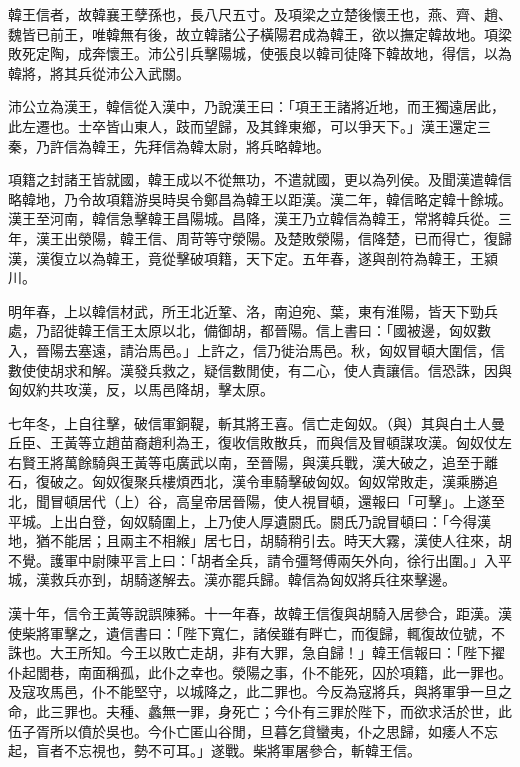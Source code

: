 
\begin{pinyinscope}
韓王信者，故韓襄王孽孫也，長八尺五寸。及項梁之立楚後懷王也，燕、齊、趙、魏皆已前王，唯韓無有後，故立韓諸公子橫陽君成為韓王，欲以撫定韓故地。項梁敗死定陶，成奔懷王。沛公引兵擊陽城，使張良以韓司徒降下韓故地，得信，以為韓將，將其兵從沛公入武關。

沛公立為漢王，韓信從入漢中，乃說漢王曰：「項王王諸將近地，而王獨遠居此，此左遷也。士卒皆山東人，跂而望歸，及其鋒東鄉，可以爭天下。」漢王還定三秦，乃許信為韓王，先拜信為韓太尉，將兵略韓地。

項籍之封諸王皆就國，韓王成以不從無功，不遣就國，更以為列侯。及聞漢遣韓信略韓地，乃令故項籍游吳時吳令鄭昌為韓王以距漢。漢二年，韓信略定韓十餘城。漢王至河南，韓信急擊韓王昌陽城。昌降，漢王乃立韓信為韓王，常將韓兵從。三年，漢王出滎陽，韓王信、周苛等守滎陽。及楚敗滎陽，信降楚，已而得亡，復歸漢，漢復立以為韓王，竟從擊破項籍，天下定。五年春，遂與剖符為韓王，王潁川。

明年春，上以韓信材武，所王北近鞏、洛，南迫宛、葉，東有淮陽，皆天下勁兵處，乃詔徙韓王信王太原以北，備御胡，都晉陽。信上書曰：「國被邊，匈奴數入，晉陽去塞遠，請治馬邑。」上許之，信乃徙治馬邑。秋，匈奴冒頓大圍信，信數使使胡求和解。漢發兵救之，疑信數閒使，有二心，使人責讓信。信恐誅，因與匈奴約共攻漢，反，以馬邑降胡，擊太原。

七年冬，上自往擊，破信軍銅鞮，斬其將王喜。信亡走匈奴。（與）其與白土人曼丘臣、王黃等立趙苗裔趙利為王，復收信敗散兵，而與信及冒頓謀攻漢。匈奴仗左右賢王將萬餘騎與王黃等屯廣武以南，至晉陽，與漢兵戰，漢大破之，追至于離石，復破之。匈奴復聚兵樓煩西北，漢令車騎擊破匈奴。匈奴常敗走，漢乘勝追北，聞冒頓居代（上）谷，高皇帝居晉陽，使人視冒頓，還報曰「可擊」。上遂至平城。上出白登，匈奴騎圍上，上乃使人厚遺閼氏。閼氏乃說冒頓曰：「今得漢地，猶不能居；且兩主不相緱」居七日，胡騎稍引去。時天大霧，漢使人往來，胡不覺。護軍中尉陳平言上曰：「胡者全兵，請令彊弩傅兩矢外向，徐行出圍。」入平城，漢救兵亦到，胡騎遂解去。漢亦罷兵歸。韓信為匈奴將兵往來擊邊。

漢十年，信令王黃等說誤陳豨。十一年春，故韓王信復與胡騎入居參合，距漢。漢使柴將軍擊之，遺信書曰：「陛下寬仁，諸侯雖有畔亡，而復歸，輒復故位號，不誅也。大王所知。今王以敗亡走胡，非有大罪，急自歸！」韓王信報曰：「陛下擢仆起閭巷，南面稱孤，此仆之幸也。滎陽之事，仆不能死，囚於項籍，此一罪也。及寇攻馬邑，仆不能堅守，以城降之，此二罪也。今反為寇將兵，與將軍爭一旦之命，此三罪也。夫種、蠡無一罪，身死亡；今仆有三罪於陛下，而欲求活於世，此伍子胥所以僨於吳也。今仆亡匿山谷閒，旦暮乞貸蠻夷，仆之思歸，如痿人不忘起，盲者不忘視也，勢不可耳。」遂戰。柴將軍屠參合，斬韓王信。


\end{pinyinscope}
